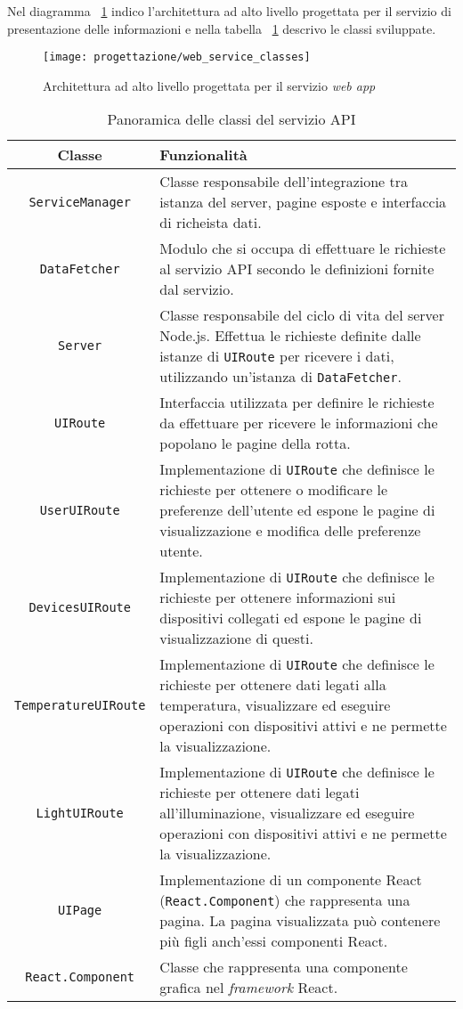 Nel diagramma ~\ref{fig:classi-web} indico l'architettura ad alto livello progettata per il servizio di presentazione delle informazioni e nella tabella ~\ref{tab:classi-web} descrivo le classi sviluppate.

\begin{figure}[H]
    \centering
    \texttt{[image: progettazione/web\_service\_classes]}
    \caption{Architettura ad alto livello progettata per il servizio \emph{web app}}
    \label{fig:classi-web}
\end{figure}

\begin{table}[htbp]
\caption{Panoramica delle classi del servizio API}
\label{tab:classi-web}
\begin{tabularx}{\linewidth}{|c|X|}
\hline
\textbf{Classe} & \textbf{Funzionalità} \\
\hline
\texttt{ServiceManager} & Classe responsabile dell'integrazione tra istanza del server, pagine esposte e interfaccia di richeista dati. \\
\hline
\texttt{DataFetcher} & Modulo che si occupa di effettuare le richieste al servizio API secondo le definizioni fornite dal servizio. \\
\hline
\texttt{Server} & Classe responsabile del ciclo di vita del server Node.js. Effettua le richieste definite dalle istanze di \texttt{UIRoute} per ricevere i dati, utilizzando un'istanza di \texttt{DataFetcher}. \\
\hline
\texttt{UIRoute} & Interfaccia utilizzata per definire le richieste da effettuare per ricevere le informazioni che popolano le pagine della rotta. \\
\hline
\texttt{UserUIRoute} & Implementazione di \texttt{UIRoute} che definisce le richieste per ottenere o modificare le preferenze dell'utente ed espone le pagine di visualizzazione e modifica delle preferenze utente. \\
\hline
\texttt{DevicesUIRoute} & Implementazione di \texttt{UIRoute} che definisce le richieste per ottenere informazioni sui dispositivi collegati ed espone le pagine di visualizzazione di questi. \\
\hline
\texttt{TemperatureUIRoute} & Implementazione di \texttt{UIRoute} che definisce le richieste per ottenere dati legati alla temperatura, visualizzare ed eseguire operazioni con dispositivi attivi e ne permette la visualizzazione. \\
\hline
\texttt{LightUIRoute} & Implementazione di \texttt{UIRoute} che definisce le richieste per ottenere dati legati all'illuminazione, visualizzare ed eseguire operazioni con dispositivi attivi e ne permette la visualizzazione. \\
\hline
\texttt{UIPage} & Implementazione di un componente React (\texttt{React.Component}) che rappresenta una pagina. La pagina visualizzata può contenere più figli anch'essi componenti React. \\
\hline
\texttt{React.Component} & Classe che rappresenta una componente grafica nel \emph{framework} React. \\
\hline
\end{tabularx}
\end{table}

